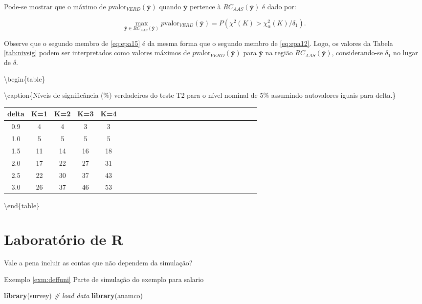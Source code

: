 \documentclass[]{book}
\newenvironment{Shaded}{\begin{snugshade}}{\end{snugshade}}
\newcommand{\KeywordTok}[1]{\textcolor[rgb]{0.13,0.29,0.53}{\textbf{#1}}}
\newcommand{\CommentTok}[1]{\textcolor[rgb]{0.56,0.35,0.01}{\textit{#1}}}
\newcommand{\NormalTok}[1]{#1}
\theoremstyle{definition}
\theoremstyle{definition}
\theoremstyle{definition}
\theoremstyle{remark}
\begin{document}
Pode-se mostrar que o máximo de
\(p\)valor\(_{VERD}\left( \mathbf{\bar{y}}\right)\) quando
\(\mathbf{\bar{y}}\) pertence à
\(RC_{AAS}\left( \mathbf{\bar{y}}\right)\) é dado por:

\begin{equation}
\max_{\mathbf{\bar{y}\in }RC_{AAS}\left( \mathbf{\bar{y}}\right) }p
\mbox{valor}_{VERD}\left( \mathbf{\bar{y}}\right) =P\left( \chi ^{2}\left(K\right) >\chi _{\alpha }^{2}\left( K\right) /\delta _{1}\right).
\label{eq:epa15}
\end{equation}

Observe que o segundo membro de \eqref{eq:epa15} é da mesma forma que o
segundo membro de \eqref{eq:epa12}. Logo, os valores da Tabela
\ref{tab:nivsig} podem ser interpretados como valores máximos de
\(p\)valor\(_{VERD}\left( \mathbf{\bar{y}}\right)\) para
\(\mathbf{\bar{y}}\) na região
\(RC_{AAS}\left(\mathbf{\bar{y}}\right)\), considerando-se
\(\delta_{1}\) no lugar de \(\delta\).

\textbackslash{}begin\{table\}

\textbackslash{}caption\{\label{tab:nivsig}Níveis de significância (\%)
verdadeiros do teste T2 para o nível nominal de 5\% assumindo
autovalores iguais para delta.\} \centering

\begin{tabular}[t]{ccccccccccccccccccccccccc}
\toprule
delta & K=1 & K=2 & K=3 & K=4\\
\midrule
0.9 & 4 & 4 & 3 & 3\\
1.0 & 5 & 5 & 5 & 5\\
1.5 & 11 & 14 & 16 & 18\\
2.0 & 17 & 22 & 27 & 31\\
2.5 & 22 & 30 & 37 & 43\\
3.0 & 26 & 37 & 46 & 53\\
\bottomrule
\end{tabular}

\textbackslash{}end\{table\}

\section{Laboratório de R}\label{laboratorio-de-r-1}

Vale a pena incluir as contas que não dependem da simulação?

Exemplo \ref{exm:deffuni} Parte de simulação do exemplo para salario

\begin{Shaded}
\begin{Highlighting}[]
\KeywordTok{library}\NormalTok{(survey)}
\CommentTok{# load data}
\KeywordTok{library}\NormalTok{(anamco)}
\end{Highlighting}
\end{Shaded}
\end{document}
